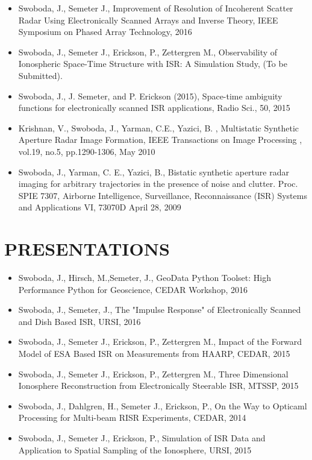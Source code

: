 \begin{itemize}
	\item Swoboda, J., Semeter J., Improvement of Resolution of Incoherent Scatter Radar Using Electronically Scanned Arrays and Inverse Theory, IEEE Symposium on Phased Array Technology, 2016
	\item Swoboda, J., Semeter J., Erickson, P., Zettergren M., Observability of Ionospheric Space-Time Structure with ISR:   A Simulation Study, (To be Submitted). 
	\item Swoboda, J., J. Semeter, and P. Erickson (2015), Space-time ambiguity functions for electronically scanned ISR applications, Radio Sci., 50, 2015

	\item Krishnan, V., Swoboda, J., Yarman, C.E., Yazici, B. , Multistatic Synthetic Aperture Radar Image Formation, IEEE Transactions on Image Processing , vol.19, no.5, pp.1290-1306, May 2010
    \item  Swoboda, J., Yarman, C. E., Yazici, B., Bistatic synthetic aperture radar imaging for arbitrary trajectories in the presence of noise and clutter. Proc. SPIE 7307, Airborne Intelligence, Surveillance, Reconnaissance (ISR) Systems and Applications VI, 73070D April 28, 2009 
\end{itemize}
	
\section*{PRESENTATIONS}
\begin{itemize}
	\item Swoboda, J., Hirsch, M.,Semeter, J., GeoData Python Toolset: High Performance Python for Geoscience, CEDAR Workshop, 2016
    \item Swoboda, J.,  Semeter, J., The "Impulse Response" of Electronically Scanned and Dish Based ISR, URSI, 2016
    \item Swoboda, J., Semeter J., Erickson, P., Zettergren M., Impact of the Forward Model of ESA Based ISR on Measurements from HAARP, CEDAR, 2015
	\item Swoboda, J., Semeter J., Erickson, P., Zettergren M., Three Dimensional Ionosphere Reconstruction from Electronically Steerable ISR, MTSSP, 2015
	\item Swoboda, J., Dahlgren, H., Semeter J., Erickson, P., On the Way to Opticaml Processing for Multi-beam RISR Experiments, CEDAR, 2014
    \item Swoboda, J., Semeter J., Erickson, P., Simulation of ISR Data and Application to Spatial Sampling of the Ionosphere, URSI, 2015
\end{itemize}

